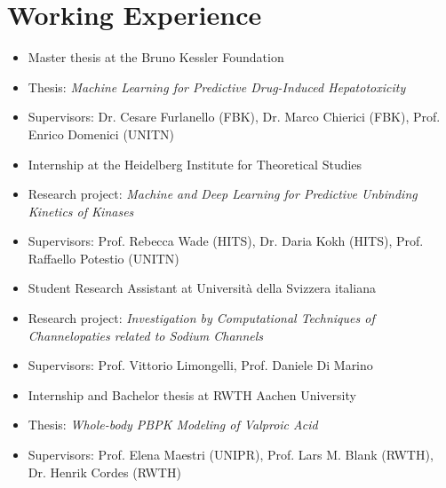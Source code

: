 \section{Working Experience}

\begin{itemize}
  \item Master thesis at the Bruno Kessler Foundation
  \item Thesis: \textit{Machine Learning for Predictive Drug-Induced Hepatotoxicity}
  \item Supervisors: Dr. Cesare Furlanello (FBK), Dr. Marco Chierici (FBK), Prof. Enrico Domenici (UNITN)
\end{itemize}


\begin{itemize}
  \item Internship at the Heidelberg Institute for Theoretical Studies
  \item Research project: \textit{Machine and Deep Learning for Predictive Unbinding Kinetics of Kinases}
  \item Supervisors: Prof. Rebecca Wade (HITS), Dr. Daria Kokh (HITS), Prof. Raffaello Potestio (UNITN)
\end{itemize}


\begin{itemize}
  \item Student Research Assistant at Università della Svizzera italiana
  \item Research project: \textit{Investigation by Computational Techniques of Channelopaties related to Sodium Channels}
  \item Supervisors: Prof. Vittorio Limongelli, Prof. Daniele Di Marino
\end{itemize}


\begin{itemize}
  \item Internship and Bachelor thesis at RWTH Aachen University
  \item Thesis: \textit{Whole-body PBPK Modeling of Valproic Acid}
  \item Supervisors: Prof. Elena Maestri (UNIPR), Prof. Lars M. Blank (RWTH), Dr. Henrik Cordes (RWTH)
\end{itemize}
